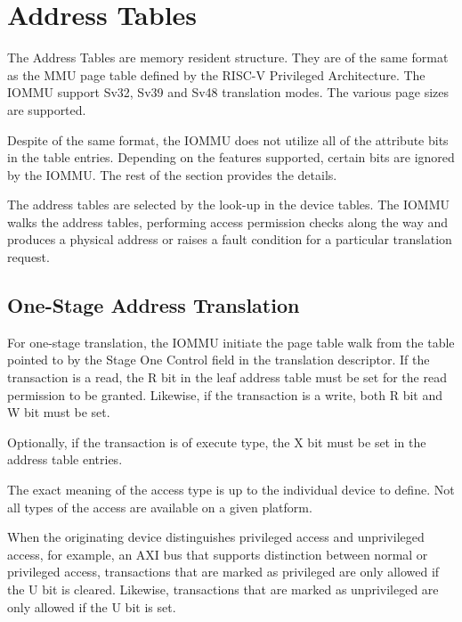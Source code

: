 \section{Address Tables}
\label{sec:addr_tbl}

The Address Tables are memory resident structure. They are of the same format as the
MMU page table defined by the RISC-V Privileged Architecture. The IOMMU support
Sv32, Sv39 and Sv48 translation modes. The various page sizes are supported.

Despite of the same format, the IOMMU does not utilize all of the attribute bits in the
table entries. Depending on the features supported, certain bits are ignored by the IOMMU.
The rest of the section provides the details.

The address tables are selected by the look-up in the device tables. The IOMMU walks the
address tables, performing access permission checks along the way and produces a physical
address or raises a fault condition for a particular translation request.


\subsection{One-Stage Address Translation}

For one-stage translation, the IOMMU initiate the page table walk from the table pointed
to by the Stage One Control field in the translation descriptor. If the transaction is a read,
the R bit in the leaf address table must be set for the read permission to be granted.
Likewise, if the transaction is a write, both R bit and W bit must be set.

Optionally, if the transaction is of execute type, the X bit must be set in the address
table entries.

\note The exact meaning of the access type is up to the individual device to define. Not
all types of the access are available on a given platform. \noteend

When the originating device distinguishes privileged access and unprivileged access, for
example, an AXI bus that supports distinction between normal or privileged access,
transactions that are marked as privileged are only allowed if the U bit is cleared.
Likewise, transactions that are marked as unprivileged are only allowed if the U bit is
set.


